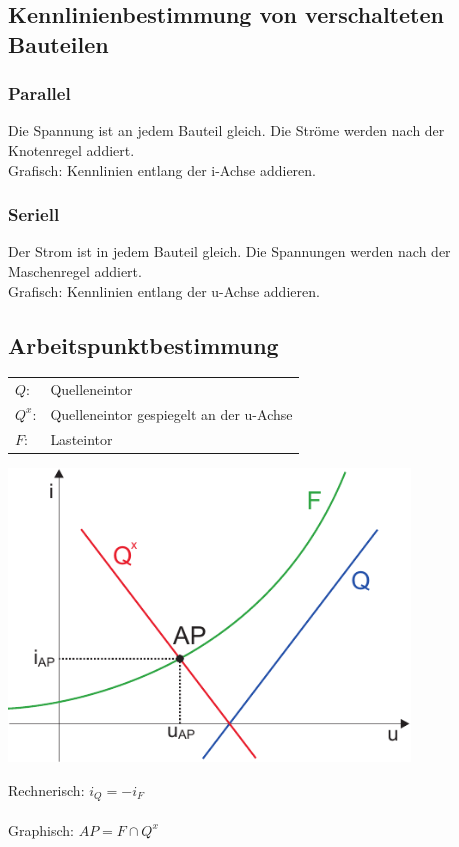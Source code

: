 \documentclass[a4paper,twocolumn,10pt]{article}
\begin{document}
\subsection*{Kennlinienbestimmung von verschalteten Bauteilen}
\subsubsection*{Parallel}
Die Spannung ist an jedem Bauteil gleich. Die Ströme werden nach der Knotenregel addiert.\\
Grafisch: Kennlinien entlang der i-Achse addieren.
\subsubsection*{Seriell}
Der Strom ist in jedem Bauteil gleich. Die Spannungen werden nach der Maschenregel addiert.\\
Grafisch: Kennlinien entlang der u-Achse addieren.

\subsection*{Arbeitspunktbestimmung}
\begin{tabular}{ll}
$Q$: & Quelleneintor\\
$Q^x$: & Quelleneintor gespiegelt an der u-Achse\\
$F$: & Lasteintor
\end{tabular}
\begin{minipage}[b]{0.23\textwidth}
\centering
\includegraphics[width=0.8\textwidth]{Grafiken/Arbeitspunkt}\\
\end{minipage}
\hfill
\begin{minipage}[b]{0.23\textwidth}
Rechnerisch: $i_Q=-i_F$\\\\
Graphisch: $AP=F\cap Q^x$
\end{minipage}
\end{document}
